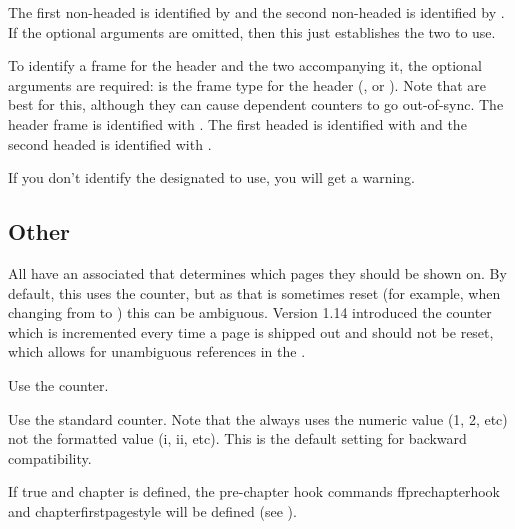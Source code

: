 \documentclass[fontsize=12pt]{scrbook}
\begin{document}
The first non-headed  is identified by 
and the second non-headed  is identified by
.
If the optional arguments are omitted, then this just establishes
the two  to use.

To identify a frame for the header and the two 
accompanying it, the optional arguments are required:
 is the frame type for the header (,
 or ). Note that 
are best for this, although they can cause dependent counters to go
out-of-sync. The header frame is identified with
. The first headed  is identified
with  and the second headed  is
identified with .

\begin{information}
If you don't identify the designated  to use, you will
get a warning.
\end{information}


\subsection{Other}
\label{sec:pkgoptsother}


All  have an associated  that determines
which pages they should be shown on. By default, this uses the
 counter, but as that is sometimes reset (for example,
when changing from  to ) this can
be ambiguous. Version 1.14 introduced the 
counter which is incremented every time a page is shipped out and
should not be reset, which allows for unambiguous references in the
.


Use the  counter.


Use the standard  counter. Note that the 
always uses the numeric value (1, 2, etc) not the formatted value
(i, ii, etc). This is the default setting for backward
compatibility. 

If true and \gls{chapter} is defined, the pre-chapter hook commands
\gls{ffprechapterhook} and \gls{chapterfirstpagestyle} will be
defined (see ).
\end{document}
